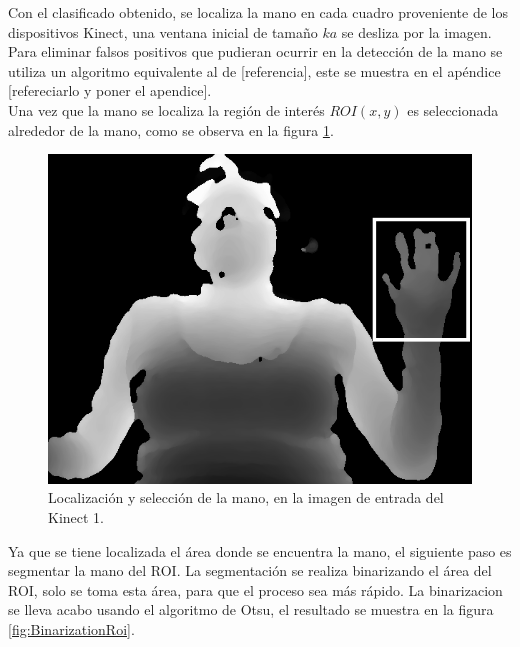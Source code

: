 Con el clasificado obtenido, se localiza la mano en cada cuadro proveniente de los dispositivos  Kinect, una ventana  inicial de tamaño $ka$ se desliza por la imagen. Para eliminar falsos positivos que pudieran ocurrir en la detección de la mano se utiliza un algoritmo equivalente al de [referencia], este se muestra en el apéndice [refereciarlo y poner el apendice].\\ 
Una vez que la mano se localiza la región de interés $ROI(x,y)$ es seleccionada alrededor de la mano, como se observa en la figura \ref{fig:Roi}.

\begin{figure}[h!]
\begin{center}
\includegraphics[scale=.5]{./Figures/roi.png}
\end{center}
\caption{Localización y selección de la mano, en la imagen de entrada del Kinect 1.}
\label{fig:Roi}
\end{figure}  

Ya que se tiene localizada el área donde se encuentra la mano, el siguiente paso es segmentar la mano del ROI. La segmentación se realiza binarizando el área del ROI, solo se toma esta área, para que el proceso sea más rápido. La binarizacion se lleva acabo usando el algoritmo de Otsu, el resultado se muestra en la figura \ref{fig:BinarizationRoi}. 
  
